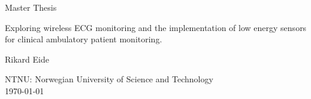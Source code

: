 \begin{titlepage}
    \begin{center}
        \vspace*{1cm}
        
        \huge{Master Thesis}
        
        \vspace{1cm}
        \normalsize
        Exploring wireless ECG monitoring and the implementation of low energy sensors for clinical ambulatory patient monitoring.
        \vspace{1.5cm}
        
        \normalsize
        {Rikard Eide}
        
        \vfill
        
        
        \vspace{0.8cm}
        
        NTNU: Norwegian University of Science and Technology\\
        \today
        
    \end{center}
\end{titlepage}